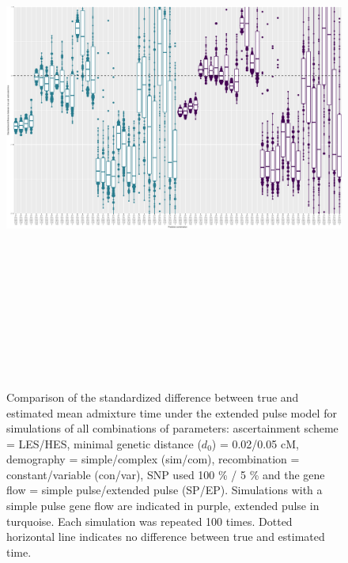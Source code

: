 \documentclass[11pt]{article}
\begin{document}
\begin{figure}
\centering
\includegraphics[width=16cm,height=18cm,keepaspectratio]{ATE_Revisions_files/figure-latex/figS2_updated_EP-1.pdf}
\caption{\label{fig:figSGLM_data_EP} Comparison of the standardized difference between true and estimated mean admixture time under the extended pulse model for simulations of all combinations of parameters: ascertainment scheme = LES/HES,   minimal genetic distance ($d_{0}$) = 0.02/0.05 cM, demography = simple/complex (sim/com), recombination = constant/variable (con/var), SNP used 100 \% / 5 \% and the gene flow = simple pulse/extended pulse (SP/EP). Simulations with a simple pulse gene flow are indicated in purple, extended pulse in turquoise. Each simulation was repeated 100 times. Dotted horizontal line indicates no difference between true and estimated time.}
\end{figure}
\end{document}
